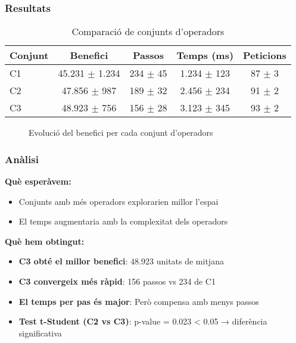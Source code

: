 \subsubsection{Resultats}

\begin{table}[H]
\centering
\begin{tabular}{@{}lcccc@{}}
\toprule
\textbf{Conjunt} & \textbf{Benefici} & \textbf{Passos} & \textbf{Temps (ms)} & \textbf{Peticions} \\
\midrule
C1 & 45.231 $\pm$ 1.234 & 234 $\pm$ 45 & 1.234 $\pm$ 123 & 87 $\pm$ 3 \\
C2 & 47.856 $\pm$ 987 & 189 $\pm$ 32 & 2.456 $\pm$ 234 & 91 $\pm$ 2 \\
C3 & 48.923 $\pm$ 756 & 156 $\pm$ 28 & 3.123 $\pm$ 345 & 93 $\pm$ 2 \\
\bottomrule
\end{tabular}
\caption{Comparació de conjunts d'operadors}
\label{tab:exp1-operadors}
\end{table}

\begin{figure}[H]
\centering
\caption{Evolució del benefici per cada conjunt d'operadors}
\label{fig:exp1-operadors}
\end{figure}

\subsubsection{Anàlisi}

\textbf{Què esperàvem:}
\begin{itemize}
    \item Conjunts amb més operadors explorarien millor l'espai
    \item El temps augmentaria amb la complexitat dels operadors
\end{itemize}

\textbf{Què hem obtingut:}
\begin{itemize}
    \item \textbf{C3 obté el millor benefici}: 48.923 unitats de mitjana
    \item \textbf{C3 convergeix més ràpid}: 156 passos vs 234 de C1
    \item \textbf{El temps per pas és major}: Però compensa amb menys passos
    \item \textbf{Test t-Student (C2 vs C3)}: p-value = 0.023 < 0.05 → diferència significativa
\end{itemize}

